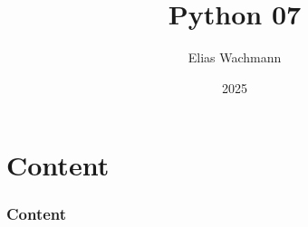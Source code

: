 \documentclass{beamer}
\title[]
{Python 07}
\author[E.~Wachmann]{\scriptsize Elias Wachmann
}
\date{2025} %
\institute[Institute of Theoretical and Computational Physics]
{
}
\begin{document}
\titleframe


\section*{Content}

\begin{frame}
\frametitle{Content}
  \tableofcontents
\end{frame}

\end{document}

